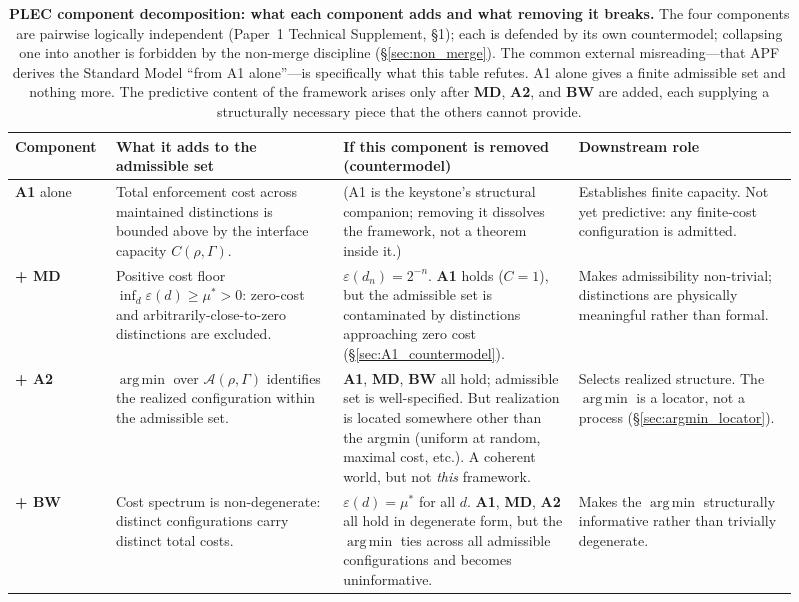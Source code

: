 \documentclass[11pt]{article}
\newcommand{\argmin}{\mathop{\mathrm{arg\,min}}}
\begin{document}
\begin{table}[ht]
\centering
\small
\setlength{\tabcolsep}{5pt}
\renewcommand{\arraystretch}{1.25}
\begin{tabular}{@{}>{\raggedright\arraybackslash}p{0.09\linewidth} >{\raggedright\arraybackslash}p{0.27\linewidth} >{\raggedright\arraybackslash}p{0.29\linewidth} >{\raggedright\arraybackslash}p{0.26\linewidth}@{}}
\toprule
\textbf{Component} & \textbf{What it adds to the admissible set} & \textbf{If this component is removed (countermodel)} & \textbf{Downstream role} \\
\midrule
\textbf{A1} alone & Total enforcement cost across maintained distinctions is bounded above by the interface capacity $C(\rho,\Gamma)$. & (A1 is the keystone's structural companion; removing it dissolves the framework, not a theorem inside it.) & Establishes finite capacity. Not yet predictive: any finite-cost configuration is admitted. \\
\textbf{+ MD} & Positive cost floor $\inf_d \varepsilon(d) \geq \mu^* > 0$: zero-cost and arbitrarily-close-to-zero distinctions are excluded. & $\varepsilon(d_n) = 2^{-n}$. \textbf{A1} holds ($C = 1$), but the admissible set is contaminated by distinctions approaching zero cost (\S\ref{sec:A1_countermodel}). & Makes admissibility non-trivial; distinctions are physically meaningful rather than formal. \\
\textbf{+ A2} & $\argmin$ over $\mathcal{A}(\rho,\Gamma)$ identifies the realized configuration within the admissible set. & \textbf{A1}, \textbf{MD}, \textbf{BW} all hold; admissible set is well-specified. But realization is located somewhere other than the argmin (uniform at random, maximal cost, etc.). A coherent world, but not \emph{this} framework. & Selects realized structure. The $\argmin$ is a locator, not a process (\S\ref{sec:argmin_locator}). \\
\textbf{+ BW} & Cost spectrum is non-degenerate: distinct configurations carry distinct total costs. & $\varepsilon(d) = \mu^*$ for all $d$. \textbf{A1}, \textbf{MD}, \textbf{A2} all hold in degenerate form, but the $\argmin$ ties across all admissible configurations and becomes uninformative. & Makes the $\argmin$ structurally informative rather than trivially degenerate. \\
\bottomrule
\end{tabular}
\caption[PLEC component decomposition]{\textbf{PLEC component decomposition: what each component adds and what removing it breaks.} The four components are pairwise logically independent (Paper~1 Technical Supplement, \S1); each is defended by its own countermodel; collapsing one into another is forbidden by the non-merge discipline (\S\ref{sec:non_merge}). The common external misreading---that APF derives the Standard Model ``from A1 alone''---is specifically what this table refutes. A1 alone gives a finite admissible set and nothing more. The predictive content of the framework arises only after \textbf{MD}, \textbf{A2}, and \textbf{BW} are added, each supplying a structurally necessary piece that the others cannot provide.}
\label{tab:plec_decomposition}
\end{table}
\end{document}
